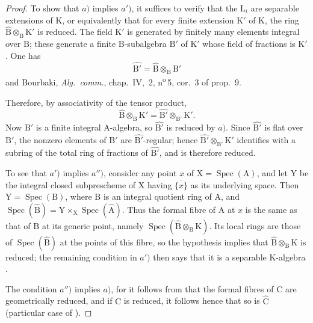 \begin{proof}
\renewcommand{\qedsymbol}{}
To show that $a)$ implies $a')$, it suffices to verify that the $\mathrm{L}_i$ are separable extensions of $\mathrm{K}$, or equivalently  that for every finite extension $\mathrm{K}'$ of $\mathrm{K}$, the ring $\widehat{\mathrm{B}}\otimes_\mathrm{B}\mathrm{K}'$ is reduced. The field $\mathrm{K}'$ is generated by finitely many elements integral over $\mathrm{B}$; these generate a finite $\mathrm{B}$-subalgebra $\mathrm{B}'$ of $\mathrm{K}'$ whose field of fractions is $\mathrm{K}'$. One has
\[
  \widehat{\mathrm{B}'}=\widehat{\mathrm{B}}\otimes_\mathrm{B}\mathrm{B}'
\]
 and Bourbaki, \emph{Alg.\ comm.}, chap.~IV, \textsection\,2, n\textsuperscript{o}\,5, cor.~3 of prop.~9.


Therefore, by associativity of the tensor product,
\[
  \widehat{\mathrm{B}}\otimes_\mathrm{B}\mathrm{K}'
  =\widehat{\mathrm{B}'}\otimes_{\mathrm{B}'}\mathrm{K}'.
\]
Now $\mathrm{B}'$ is a finite integral $\mathrm{A}$-algebra, so $\widehat{\mathrm{B}'}$ is reduced by $a)$. Since $\widehat{\mathrm{B}'}$ is flat over $\mathrm{B}'$, the nonzero elements of $\mathrm{B}'$ are $\widehat{\mathrm{B}'}$-regular; hence $\widehat{\mathrm{B}'}\otimes_{\mathrm{B}'}\mathrm{K}'$ identifies with a subring of the total ring of fractions of $\widehat{\mathrm{B}'}$, and is therefore reduced.

To see that $a')$ implies $a'')$, consider any point $x$ of $\mathrm{X}=\operatorname{Spec}(\mathrm{A})$, and let $\mathrm{Y}$ be the integral closed subprescheme of $\mathrm{X}$ having $\overline{\{x\}}$ as its underlying space. Then $\mathrm{Y}=\operatorname{Spec}(\mathrm{B})$, where $\mathrm{B}$ is an integral quotient ring of $\mathrm{A}$, and $\operatorname{Spec}(\widehat{\mathrm{B}})=\mathrm{Y}\times_\mathrm{X}\operatorname{Spec}(\widehat{\mathrm{A}})$. Thus the formal fibre of $\mathrm{A}$ at $x$ is the same as that of $\mathrm{B}$ at its generic point, namely $\operatorname{Spec}(\widehat{\mathrm{B}}\otimes_\mathrm{B}\mathrm{K})$. Its local rings are those of $\operatorname{Spec}(\widehat{\mathrm{B}})$ at the points of this fibre, so the hypothesis implies that $\widehat{\mathrm{B}}\otimes_\mathrm{B}\mathrm{K}$ is reduced; the remaining condition in $a')$ then says that it is a separable $\mathrm{K}$-algebra .

The condition $a'')$ implies $a)$, for it follows from  that the formal fibres of $\mathrm{C}$ are geometrically reduced, and if $\mathrm{C}$ is reduced, it follows hence that so is $\widehat{\mathrm{C}}$ (particular case of ).


\end{proof}
